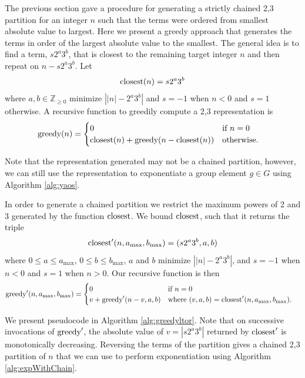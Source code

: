 \documentclass{ucalgthes1}
\theoremstyle{definition}
\newcommand{\ZZgez}{\mathbb{Z}_{\ge 0}}
\newcommand{\amax}{a_\textrm{max}}
\newcommand{\bmax}{b_\textrm{max}}
\begin{document}
The previous section gave a procedure for generating a strictly chained 2,3 partition for an integer $n$ such that the terms were ordered from smallest absolute value to largest.  Here we present a greedy approach that generates the terms in order of the largest absolute value to the smallest. The general idea is to find a term, $s2^a3^b$, that is closest to the remaining target integer $n$ and then repeat on $n - s2^a3^b$. Let
\[
\textrm{closest}(n) = s2^a3^b
\]
where $a,b \in \ZZgez$ minimize $\left| |n| - 2^a3^b \right|$ and $s = -1$ when $n < 0$ and $s = 1$ otherwise. A recursive function to greedily compute a 2,3 representation is
\begin{align*}
\textrm{greedy}(n) &= \begin{cases}
              0 & \textrm{if $n = 0$} \\
              \textrm{closest}(n) + \textrm{greedy}(n - \textrm{closest}(n)) & \textrm{otherwise}.
          \end{cases}
\end{align*}

\noindent
Note that the representation generated may not be a chained partition, however, we can still use the representation to exponentiate a group element $g \in G$ using Algorithm \ref{alg:yaos}.

In order to generate a chained partition we restrict the maximum powers of 2 and 3 generated by the function $\textrm{closest}$.  We bound $\textrm{closest}$, such that it returns the triple
\[
\closest'(n, \amax, \bmax) = (s2^a3^b, a, b)
\]
where $0 \le a \le \amax$, $0 \le b \le \bmax$, $a$ and $b$ minimize $\left| |n| - 2^a3^b \right|$, and $s=-1$ when $n < 0$ and $s=1$ when $n > 0$. Our recursive function is then
\begin{align*}
\greedychain(n, \amax, \bmax) &= \begin{cases}
        0 & \textrm{if $n = 0$} \\
        v + \greedychain(n - v, a, b) & \textrm{where $(v, a, b) = \closest'(n, \amax, \bmax)$}.
    \end{cases}
\end{align*}

\noindent
We present pseudocode in Algorithm \ref{alg:greedyltor}. Note that on successive invocations of $\textrm{greedy}'$, the absolute value of $v=|s2^a3^b|$ returned by $\textrm{closest}'$ is monotonically decreasing.  Reversing the terms of the partition gives a chained 2,3 partition of $n$ that we can use to perform exponentiation using Algorithm \ref{alg:expWithChain}.
\end{document}
